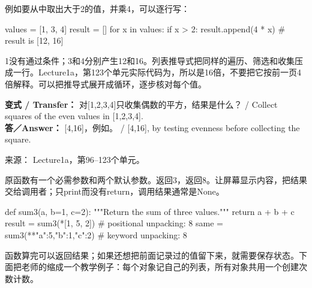例如要从中取出大于2的值，并乘4，可以逐行写：



\begin{StudyCode}
values = [1, 3, 4]
result = []
for x in values:
    if x > 2:
        result.append(4 * x)
# result is [12, 16]
\end{StudyCode}


1没有通过条件；3和4分别产生12和16。列表推导式把同样的遍历、筛选和收集压成一行。Lecture1a，第123个单元实际代码为，所以是16倍，不要把它按前一页4倍解释。可以把推导式展开成循环，逐步核对每个值。


\textbf{变式 / Transfer：} 对[1,2,3,4]只收集偶数的平方，结果是什么？ / Collect squares of the even values in [1,2,3,4].\\

\textbf{答／Answer：} [4,16]，例如\StudyInline{[x*x for x in [1,2,3,4] if x\%2=\allowbreak{}=\allowbreak{}0]}。 / [4,16], by testing evenness before collecting the square.


来源： Lecture1a，第96–123个单元。








原函数有一个必需参数和两个默认参数。返回3，返回8。让屏幕显示内容，把结果交给调用者；只print而没有return，调用结果通常是None。



\begin{StudyCode}
def sum3(a, b=1, c=2):
    """Return the sum of three values."""
    return a + b + c
result = sum3(*[1, 5, 2])          # positional unpacking: 8
same = sum3(**{"a":5,"b":1,"c":2}) # keyword unpacking: 8
\end{StudyCode}


函数算完可以返回结果；如果还想把前面记录过的值留下来，就需要保存状态。下面把老师的缩成一个教学例子：每个对象记自己的列表，所有对象共用一个创建次数计数。



